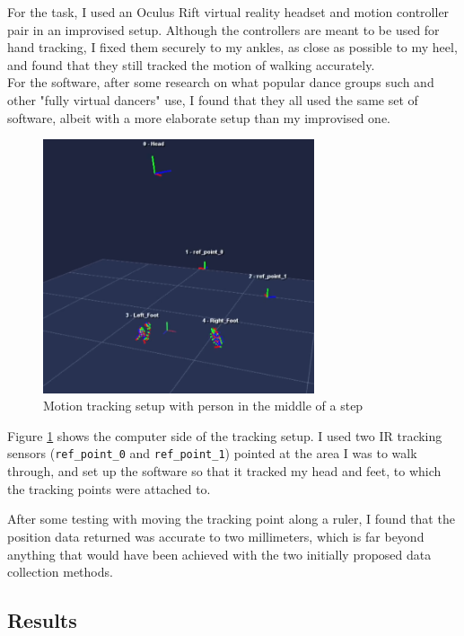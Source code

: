 \documentclass[12pt, a4paper]{article}
\begin{document}
For the task, I used an Oculus Rift virtual reality headset and motion
controller pair in an improvised setup. Although the controllers are meant to be
used for hand tracking, I fixed them securely to my ankles, as close as possible
to my heel, and found that they still tracked the motion of walking accurately.
\\

For the software, after some research on what popular dance groups such and
other "fully virtual dancers" use, I found that they all used the same set of
software, albeit with a more elaborate setup than my improvised one.

\begin{figure}[H]
    \centering
    \includegraphics[width=8cm]{mocap_software}
    \caption{Motion tracking setup with person in the middle of a step}
    \label{mocap}
\end{figure}

Figure \ref{mocap} shows the computer side of the tracking setup. I used two IR
tracking sensors (\texttt{ref\_point\_0} and \texttt{ref\_point\_1}) pointed at
the area I was to walk through, and set up the software so that it tracked my
head and feet, to which the tracking points were attached to.

After some testing with moving the tracking point along a ruler, I found that
the position data returned was accurate to two millimeters, which is far beyond
anything that would have been achieved with the two initially proposed data
collection methods.

\subsection{Results}
\label{results}
\end{document}

